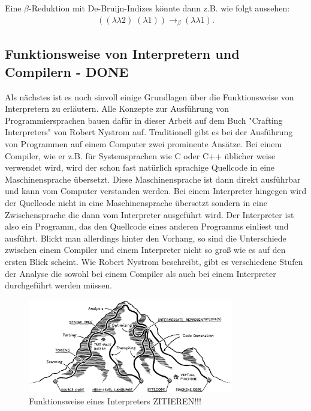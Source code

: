 \documentclass[ngerman]{article}
\begin{document}
Eine $\beta$-Reduktion mit De-Bruijn-Indizes könnte dann z.B. wie folgt aussehen:
\begin{align*}
    ((\lambda \lambda 2) \; (\lambda 1)) \rightarrow_\beta (\lambda\lambda 1).
\end{align*}

\subsection{Funktionsweise von Interpretern und Compilern - DONE}

Als nächstes ist es noch sinvoll einige Grundlagen über die Funktionsweise von Interpretern zu erläutern. Alle Konzepte zur Ausführung von Programmiersprachen bauen dafür in dieser Arbeit auf dem Buch "Crafting Interpreters" von Robert Nystrom \cite*{nystrom} auf.
Traditionell gibt es bei der Ausführung von Programmen auf einem Computer zwei prominente Ansätze. Bei einem Compiler, wie er z.B. für Systemsprachen wie C oder C++ üblicher weise verwendet wird, wird der schon fast natürlich sprachige Quellcode in eine Maschinensprache übersetzt. Diese Maschinensprache ist dann direkt ausführbar und kann vom Computer verstanden werden. Bei einem Interpreter hingegen wird der Quellcode nicht in eine Maschinensprache übersetzt sondern in eine Zwischensprache die dann vom Interpreter ausgeführt wird. Der Interpreter ist also ein Programm, das den Quellcode eines anderen Programms einliest und ausführt.
Blickt man allerdings hinter den Vorhang, so sind die Unterschiede zwischen einem Compiler und einem Interpreter nicht so groß wie es auf den ersten Blick scheint. Wie Robert Nystrom beschreibt, gibt es verschiedene Stufen der Analyse die sowohl bei einem Compiler als auch bei einem Interpreter durchgeführt werden müssen.

\begin{figure}
    \centering
    \includegraphics[width=0.8\textwidth]{mountain.png}
    \caption{Funktionsweise eines Interpreters ZITIEREN!!!}
    \label{fig:interpreter}
\end{figure}
\end{document}
